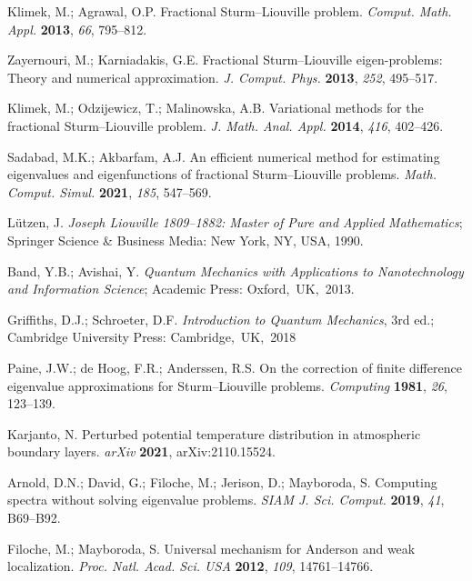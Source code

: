 \documentclass[symmetry,article,accept,moreauthors,pdftex,a4paper]{mdpi}
\begin{document}
\begin{thebibliography}{99}
 Klimek, M.; Agrawal, O.P. Fractional Sturm--Liouville problem. \textit{Comput. Math. Appl.} \textbf{2013}, \emph{66}, 795--812.

 Zayernouri, M.; Karniadakis, G.E. Fractional Sturm--Liouville eigen-problems: Theory and numerical approximation. \textit{J. Comput. Phys.} \textbf{2013}, \emph{252}, 495--517.

 Klimek, M.; Odzijewicz, T.; Malinowska, A.B. Variational methods for the fractional Sturm--Liouville problem. \textit{J. Math. Anal. Appl.} \textbf{2014}, \emph{416}, 402--426.

 Sadabad, M.K.; Akbarfam, A.J. An efficient numerical method for estimating eigenvalues and eigenfunctions of fractional Sturm--Liouville problems. \textit{Math. Comput. Simul.} \textbf{2021}, \emph{185}, 547--569.

 Lützen, J. \textit{Joseph Liouville 1809--1882: Master of Pure and Applied Mathematics}; Springer Science \& Business Media: New York, NY, USA,  1990.

 Band, Y.B.; Avishai, Y. \textit{Quantum Mechanics with Applications to Nanotechnology and Information Science};  Academic Press: \mbox{Oxford, UK, 2013.}

 Griffiths, D.J.; Schroeter, D.F. \textit{Introduction to Quantum Mechanics}, 3rd ed.; Cambridge University Press: \mbox{Cambridge, UK, 2018}

 Paine, J.W.; de Hoog, F.R.; Anderssen, R.S. On the correction of finite difference eigenvalue approximations for Sturm--Liouville problems. \textit{Computing} \textbf{1981}, \emph{26}, 123--139.

 Karjanto, N. Perturbed potential temperature distribution in atmospheric boundary layers. \emph{arXiv} \textbf{2021}, arXiv:2110.15524.

 Arnold, D.N.; David, G.; Filoche, M.; Jerison, D.; Mayboroda, S. Computing spectra without solving eigenvalue problems. \textit{SIAM J. Sci. Comput.} \textbf{2019}, \emph{41}, B69--B92.

 Filoche, M.; Mayboroda, S. Universal mechanism for Anderson and weak localization. \textit{Proc. Natl. Acad. Sci. USA} \textbf{2012}, \emph{109}, 14761--14766.

\end{thebibliography}
\end{document}
